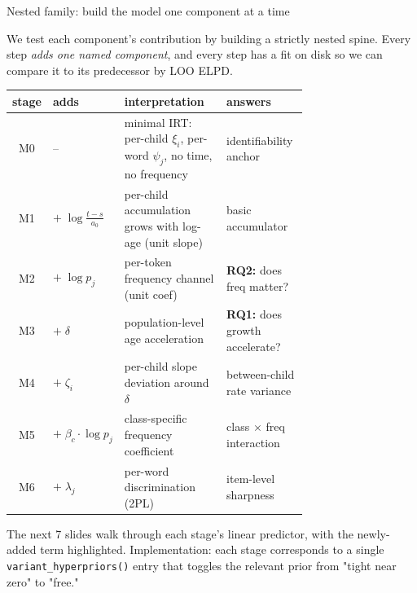 \documentclass[aspectratio=169,t]{beamer}
\renewcommand{\arraystretch}{1.05}
\begin{document}
\begin{frame}{Nested family: build the model one component at a time}

We test each component's contribution by building a strictly nested
spine. Every step \emph{adds one named component}, and every step has
a fit on disk so we can compare it to its predecessor by LOO ELPD.

\vspace{0.6em}
\centering
\small
\renewcommand{\arraystretch}{1.15}
\begin{tabular}{@{}clp{0.42\linewidth}p{0.30\linewidth}@{}}
\toprule
\textbf{stage} & \textbf{adds} & \textbf{interpretation} & \textbf{answers} \\
\midrule
M0 & --                       & minimal IRT: per-child $\xi_i$, per-word $\psi_j$, no time, no frequency & identifiability anchor \\
M1 & $+\;\log\!\frac{t-s}{a_0}$         & per-child accumulation grows with log-age (unit slope) & basic accumulator \\
M2 & $+\;\log p_j$            & per-token frequency channel (unit coef) & \textbf{RQ2:} does freq matter? \\
M3 & $+\;\delta$              & population-level age acceleration & \textbf{RQ1:} does growth accelerate? \\
M4 & $+\;\zeta_i$             & per-child slope deviation around $\delta$ & between-child rate variance \\
M5 & $+\;\beta_c\!\cdot\!\log p_j$ & class-specific frequency coefficient & class $\times$ freq interaction \\
M6 & $+\;\lambda_j$           & per-word discrimination (2PL) & item-level sharpness \\
\bottomrule
\end{tabular}

\vspace{0.6em}
\footnotesize
The next 7 slides walk through each stage's linear predictor, with the
newly-added term highlighted. Implementation: each stage corresponds
to a single \texttt{variant\_hyperpriors()} entry that toggles the
relevant prior from "tight near zero" to "free."

\end{frame}
\end{document}
